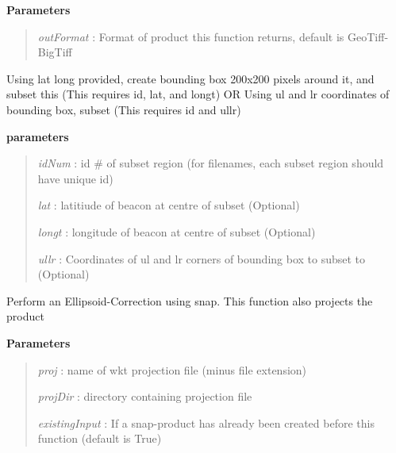 \documentclass[letterpaper,10pt,openany,oneside]{sphinxmanual}
\begin{document}
\begin{fulllineitems}
\begin{fulllineitems}
\textbf{Parameters}
\begin{quote}

\emph{outFormat} : Format of product this function returns, default is GeoTiff-BigTiff
\end{quote}

\end{fulllineitems}


\begin{fulllineitems}
\label{code:Image.Image.snapSubset}
Using lat long provided, create bounding box 200x200 pixels around it, and subset this
(This requires id, lat, and longt)
OR
Using ul and lr coordinates of bounding box, subset
(This requires id and ullr)

\textbf{parameters}
\begin{quote}

\emph{idNum} : id \# of subset region (for filenames, each subset region should have unique id)

\emph{lat} : latitiude of beacon at centre of subset (Optional)

\emph{longt} : longitude of beacon at centre of subset (Optional)

\emph{ullr} : Coordinates of ul and lr corners of bounding box to subset to (Optional)
\end{quote}

\end{fulllineitems}


\begin{fulllineitems}
\label{code:Image.Image.snapTC}
Perform an Ellipsoid-Correction using snap. This function also projects the product

\textbf{Parameters}
\begin{quote}

\emph{proj} : name of wkt projection file (minus file extension)

\emph{projDir} : directory containing projection file

\emph{existingInput} : If a snap-product has already been created before this function (default is True)


\end{quote}
\end{fulllineitems}
\end{fulllineitems}
\end{document}
